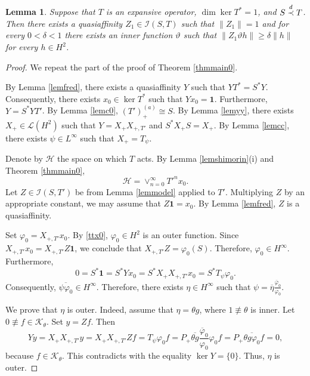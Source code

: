 \documentclass[a4paper,oneside,11pt]{amsart}
\numberwithin{equation}{section}
\theoremstyle{plain}
\newtheorem{lemma}[theorem]{Lemma}
\theoremstyle{definition}
\begin{document}
\begin{lemma}\label{lemrr1}
Suppose that  $T$
 is  an expansive operator,   $\dim\ker T^*=1$, and $S\buildrel d\over\prec T$.  
Then there exists a quasiaffinity $Z_1\in \mathcal I(S,T)$ such that
  $\|Z_1\|=1$ and for every $0<\delta<1$ there exists an inner function $\vartheta$ 
such that  $\|Z_1\vartheta h\|\geq\delta \|h\|$ for every $h\in H^2$.
\end{lemma}

\begin{proof} We repeat the part of the proof of  Theorem \ref{thmmain0}. 

By Lemma \ref{lemfred}, there exists a quasiaffinity $Y$
such that  $YT^*=S^*Y$. Consequently, there exists  $x_0\in\ker T^*$ such that   $Yx_0= \mathbf{1}$. 
Furthermore, $Y=S^*YT'$.  By Lemma \ref{lemc0}, $(T')_+^{(a)}\cong S$. By Lemma \ref{lemyy}, there exists 
$X_+\in\mathcal L(H^2)$ such that  $Y=X_+X_{+,T'}$ and $S^*X_+S=X_+$. By Lemma \ref{lemcc},  there exists $\psi\in L^\infty$ such that $X_+=T_\psi$. 

Denote by $\mathcal H$ the space on which $T$ acts. By Lemma \ref{lemshimorin}(i) and Theorem \ref{thmmain0}, 
\begin{equation}\label{ttx0} \mathcal H= \vee_{n=0}^\infty T'^nx_0.\end{equation}  
Let $Z\in \mathcal I(S, T')$ be from Lemma \ref{lemmodel} applied to $T'$. 
Multiplying $Z$ by an appropriate constant, we may assume that     $Z\mathbf{1}=x_0$. 
By Lemma \ref{lemfred}, $Z$ is a quasiaffinity. 

Set $\varphi_0=X_{+,T'}x_0$. By \eqref{ttx0},  $\varphi_0\in H^2$ is an outer function. 
Since $X_{+,T'}x_0=X_{+,T'}Z\mathbf{1}$, we conclude that $X_{+,T'}Z=\varphi_0(S)$. Therefore,
 $\varphi_0\in  H^\infty$. 
Furthermore, \begin{equation*} 0=S^*\mathbf{1}=S^*Yx_0=S^*X_+X_{+,T'}x_0=S^*T_\psi \varphi_0.
\end{equation*}
Consequently, $\overline{\psi\varphi_0}\in H^\infty$.  
Therefore, there exists $\eta\in H^\infty$ such that $\psi=\overline\eta\frac{\overline\varphi_0}{\varphi_0}$. 

We prove that $\eta$ is outer. Indeed, assume that $\eta=\theta g$, where $1\not\equiv\theta$ is inner. 
Let $0\not\equiv f\in \mathcal K_\theta$.  Set $y=Zf$. Then
\begin{equation*}Yy=X_+ X_{+,T'}y=X_+ X_{+,T'}Zf= T_\psi  \varphi_0 f=P_+\overline{\theta g}\frac{\overline\varphi_0}{\varphi_0}\varphi_0 f=
P_+\overline{\theta g\varphi_0} f=0,
\end{equation*}
because $f\in\mathcal K_\theta$. This contradicts with the equality $\ker Y=\{0\}$.  Thus, $\eta$ is outer. 



\end{proof}
\end{document}
